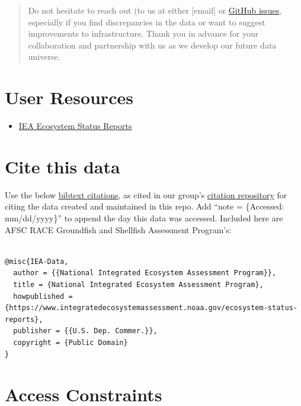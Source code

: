 \documentclass[
  letterpaper,
  oneside,
  open=any]{scrbook}
\providecommand{\tightlist}{%
  \setlength{\itemsep}{0pt}\setlength{\parskip}{0pt}}\usepackage{longtable,booktabs,array}
\begin{document}
\begin{quote}
Do not hesitate to reach out (to us at either {[}email{]} or
\href{https://github.com/IEA-Data/IEA_Data_Guidance_Doc//issues}{GitHub
issues}, especially if you find discrepancies in the data or want to
suggest improvements to infrastructure. Thank you in advance for your
collaboration and partnership with us as we develop our future data
universe.
\end{quote}

\section*{User Resources}\label{user-resources}


\begin{itemize}
\tightlist
\item
  \href{https://www.integratedecosystemassessment.noaa.gov/ecosystem-status-reports}{IEA
  Ecosystem Status Reports}
\end{itemize}

\section*{Cite this data}\label{cite-this-data}


Use the below
\href{https://github.com/IEA-Data/IEA_Data_Guidance_Doc//blob/main/CITATION.bib}{bibtext
citations}, as cited in our group's
\href{https://github.com/IEA-Data/citations/blob/main/cite/bibliography.bib}{citation
repository} for citing the data created and maintained in this repo. Add
``note = \{Accessed: mm/dd/yyyy\}'' to append the day this data was
accessed. Included here are AFSC RACE Groundfish and Shellfish
Assessment Program's:

\begin{verbatim}

@misc{IEA-Data,
  author = {{National Integrated Ecosystem Assessment Program}},
  title = {National Integrated Ecosystem Assessment Program},
  howpublished = {https://www.integratedecosystemassessment.noaa.gov/ecosystem-status-reports},
  publisher = {{U.S. Dep. Commer.}},
  copyright = {Public Domain} 
}
\end{verbatim}

\section*{Access Constraints}\label{access-constraints}
\end{document}
